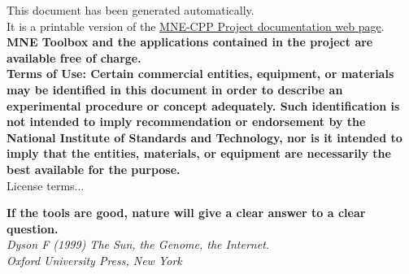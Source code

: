 \documentclass[12pt, twoside]{article}
\newcommand{\versionnumber}{0.1.9}
\begin{document}
\begin{titlepage}
\noindent \normalsize This document has been generated automatically. \\
It is a printable version of the \href{https://mne-cpp.github.io}{MNE-CPP Project documentation web page}.
\vfill
\noindent\normalsize \textbf{MNE Toolbox and the applications contained in the project are available free of charge.} \\
\vfill	
\noindent
\footnotesize \noindent \textbf{Terms of Use: Certain commercial entities, equipment, or materials may be identified in this document in order to describe an experimental procedure or concept adequately. Such identification is not intended to imply recommendation or endorsement by the National Institute of Standards and Technology, nor is it intended to imply that the entities, materials, or equipment are necessarily the best available for the purpose.}\\ 
\vfill
\footnotesize License terms...
\vfill
\end{titlepage}
\begin{titlepage}
\begin{flushright}
\vspace*{\fill}
\noindent\normalsize\textbf{If the tools are good, nature will give a clear answer to a clear question.} \\
\textit{Dyson F (1999) The Sun, the Genome, the Internet. \\Oxford University Press, New York} \\
\vspace*{\fill}
\end{flushright}
\end{titlepage}

\fancyhf{}
\fancyhead[CE]{Version: \versionnumber}
\fancyhead[RE]{\today}
\fancyhead[LO]{\nouppercase\leftmark}
\fancyhead[RO]{\nouppercase\rightmark}
\renewcommand{\subsectionmark}[1]{\markright{\thesubsection\ #1}}
\setlength\headheight{26pt}
\fancyheadoffset{0cm} 
\end{document}
